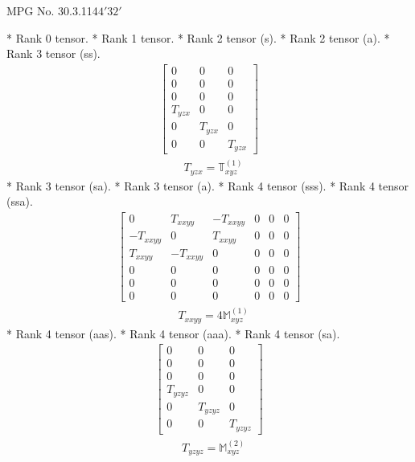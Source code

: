 \documentclass[fleqn,8pt,landscape]{jsarticle}
\begin{document}
\setcounter{MaxMatrixCols}{32}

\renewcommand{\tablename}{Table~}
\renewcommand{\figurename}{Figure~}
\begin{center}
\LARGE
MPG No. 30.3.114\quad$4'32'$
\end{center}
* Rank 0 tensor.
* Rank 1 tensor.
* Rank 2 tensor (s).
* Rank 2 tensor (a).
* Rank 3 tensor (ss).
\begin{align*}
\begin{bmatrix} 0 & 0 & 0 \\ 0 & 0 & 0 \\ 0 & 0 & 0 \\ T_{yzx} & 0 & 0 \\ 0 & T_{yzx} & 0 \\ 0 & 0 & T_{yzx} \end{bmatrix}
\end{align*}
\begin{align*}
& T_{yzx} = \mathbb{T}_{xyz}^{(1)}
\end{align*}
* Rank 3 tensor (sa).
* Rank 3 tensor (a).
* Rank 4 tensor (sss).
* Rank 4 tensor (ssa).
\begin{align*}
\begin{bmatrix} 0 & T_{xxyy} & - T_{xxyy} & 0 & 0 & 0 \\ - T_{xxyy} & 0 & T_{xxyy} & 0 & 0 & 0 \\ T_{xxyy} & - T_{xxyy} & 0 & 0 & 0 & 0 \\ 0 & 0 & 0 & 0 & 0 & 0 \\ 0 & 0 & 0 & 0 & 0 & 0 \\ 0 & 0 & 0 & 0 & 0 & 0 \end{bmatrix}
\end{align*}
\begin{align*}
& T_{xxyy} = 4 \mathbb{M}_{xyz}^{(1)}
\end{align*}
* Rank 4 tensor (aas).
* Rank 4 tensor (aaa).
* Rank 4 tensor (sa).
\begin{align*}
\begin{bmatrix} 0 & 0 & 0 \\ 0 & 0 & 0 \\ 0 & 0 & 0 \\ T_{yzyz} & 0 & 0 \\ 0 & T_{yzyz} & 0 \\ 0 & 0 & T_{yzyz} \end{bmatrix}
\end{align*}
\begin{align*}
& T_{yzyz} = \mathbb{M}_{xyz}^{(2)}
\end{align*}
\end{document}
